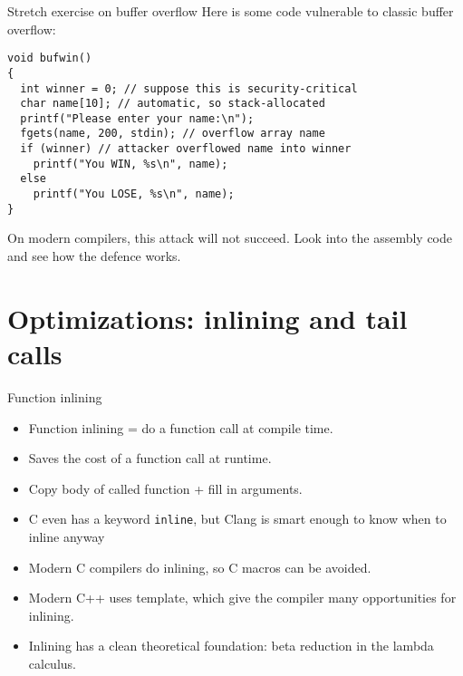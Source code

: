 \documentclass[landscape]{beamer}
\begin{document}
\begin{frame}[fragile]{Stretch exercise on buffer overflow}
Here is some code vulnerable to classic buffer overflow:
\begin{verbatim}
void bufwin()
{
  int winner = 0; // suppose this is security-critical
  char name[10]; // automatic, so stack-allocated  
  printf("Please enter your name:\n");
  fgets(name, 200, stdin); // overflow array name
  if (winner) // attacker overflowed name into winner
    printf("You WIN, %s\n", name);
  else
    printf("You LOSE, %s\n", name);
}
\end{verbatim}
On modern compilers, this attack will not succeed. Look into the assembly code and see how the defence works.
\end{frame}



\section{Optimizations: inlining and tail calls}


\begin{frame}{Function inlining}

\begin{itemize}
\item
Function inlining = do a function call at compile time.
\item
Saves the cost of a function call at runtime.
\item
Copy body of called function + fill in arguments.
\item C even has a keyword \texttt{inline}, but Clang is smart enough to know when to inline anyway
\item
Modern C compilers do inlining, so C macros can be avoided.
\item
Modern C++ uses template, which give the compiler many opportunities for inlining.
\item
Inlining has a clean theoretical foundation: beta reduction in the lambda calculus.

\end{itemize}


\end{frame}
\end{document}
